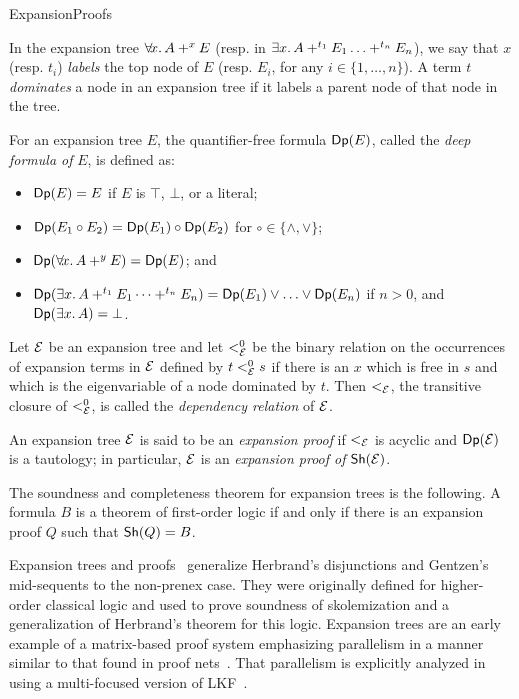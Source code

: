 \begin{entry}{ExpansionProofs}
\begin{calculus}
\medskip

In the expansion tree $\ALLx x. A +^x E$ (resp. in $\EX x. A +^{t_1} E_1
\ldots +^{t_n} E_n$), we say that $x$ (resp. $t_i$) \emph{labels} the top node
of $E$ (resp. $E_i$, for any $i \in\{1,\ldots,n\}$).  A term
$t$ \emph{dominates} a node in an expansion tree if it labels a parent
node of that node in the tree.

\medskip

For an expansion tree $E$, the quantifier-free formula $\mathsf{Dp}(E)$, 
called the \emph{deep formula of} $E$, is defined as:
\begin{itemize}
\item $\mathsf{Dp}(E) = E$ if $E$ is $\top$, $\bot$, or a literal;
\item $\mathsf{Dp}(E_1 \circ E_2) = \mathsf{Dp}(E_1) \circ \mathsf{Dp}(E_2)$ for
      $\circ\in\{\land, \lor \}$; 
\item $\Deep{\ALLx x. A +^y E} = \Deep{E}$; and
\item $\Deep{\EX x. A +^{t_1} E_1 \cdots +^{t_n} E_n} = 
       \Deep{E_1}\lor\ldots\lor \Deep{E_n}$ if $n > 0$, and $\Deep{\EX
  x. A} = \bot$. 
\end{itemize}

Let $\mathcal{E}$ be an expansion tree and let $<^0_{\mathcal{E}}$ be the binary
relation on the occurrences of expansion terms in $\mathcal{E}$ defined by
$t <^0_{\mathcal{E}} s$ if there is an $x$ which is free in $s$ and which is
the eigenvariable of a node dominated by $t$.  Then $<_{\mathcal{E}}$, the
transitive closure of $<^0_{\mathcal{E}}$, is called the
\emph{dependency relation} of $\mathcal{E}$.

\medskip

An expansion tree $\mathcal{E}$ is said to be an \emph{expansion proof} if
$<_{\mathcal{E}}$ is acyclic and $\mathsf{Dp}(\mathcal{E})$ is a tautology; in particular,
$\mathcal{E}$ is an \emph{expansion proof of} $\mathsf{Sh}(\mathcal{E})$.
\end{calculus}


\begin{clarifications}
The soundness and completeness theorem for expansion trees is the
following.  A formula $B$ is a theorem of first-order logic if and
only if there is an expansion proof $Q$ such that $\mathsf{Sh}(Q)=B$.
\end{clarifications}

\begin{history}
Expansion trees and proofs~\cite{miller87sl,miller83}
generalize Herbrand's disjunctions and
Gentzen's mid-sequents to the non-prenex case.  
They were originally defined
for higher-order classical logic and used to prove soundness
of skolemization and a generalization of
Herbrand's theorem for this logic.  Expansion trees are an early example of a
matrix-based proof system emphasizing parallelism in a manner similar to that found in proof
nets~.  That parallelism is explicitly analyzed
in~\cite{chaudhuri14jlc} using a multi-focused version of
LKF~.
\end{history}



\end{entry}

